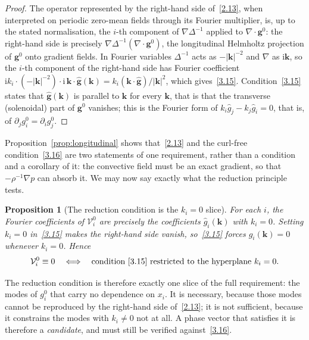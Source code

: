\documentclass[11pt]{jfm}
\newtheorem{proposition}[lemma]{Proposition}
\numberwithin{equation}{section}
\begin{document}
\begin{proof}
The operator represented by the right-hand side of~\eqref{2.13}, when interpreted on periodic
zero-mean fields through its Fourier multiplier, is, up to the stated normalisation, the $i$-th
component of $\nabla\Delta^{-1}$ applied to $\nabla\cdot\boldsymbol{g}^0$: the right-hand side
is precisely $\nabla\Delta^{-1}(\nabla\cdot\boldsymbol{g}^0)$, the longitudinal Helmholtz projection of
$\boldsymbol{g}^0$ onto gradient fields. In Fourier variables $\Delta^{-1}$ acts as
$-|\boldsymbol{k}|^{-2}$ and $\nabla$ as $\mathrm{i}\boldsymbol{k}$, so the $i$-th component of
the right-hand side has Fourier coefficient
$\mathrm{i}k_i\cdot(-|\boldsymbol{k}|^{-2})\cdot\mathrm{i}\,\boldsymbol{k}\cdot
\widehat{\boldsymbol{g}}(\boldsymbol{k})
= k_i(\boldsymbol{k}\cdot\widehat{\boldsymbol{g}})/|\boldsymbol{k}|^{2}$,
which gives~\eqref{3.15}. Condition~\eqref{3.15} states that
$\widehat{\boldsymbol{g}}(\boldsymbol{k})$ is parallel to $\boldsymbol{k}$ for every
$\boldsymbol{k}$, that is that the transverse (solenoidal) part of $\boldsymbol{g}^0$ vanishes;
this is the Fourier form of $k_i\widehat{g}_j-k_j\widehat{g}_i=0$, that is, of
$\partial_j g_i^0 = \partial_i g_j^0$.
\end{proof}

Proposition~\ref{prop:longitudinal} shows that~\eqref{2.13} and the curl-free
condition~\eqref{3.16} are two statements of one requirement, rather than a condition and a
corollary of it: the convective field must be an exact gradient, so that $-\rho^{-1}\nabla p$
can absorb it. We may now say exactly what the reduction principle tests.

\begin{proposition}[The reduction condition is the $k_i=0$ slice]
\label{prop:slice}
For each $i$, the Fourier coefficients of $\mathcal V_i^0$ are precisely the coefficients
$\widehat{g}_i(\boldsymbol{k})$ with $k_i=0$. Setting $k_i=0$ in~\eqref{3.15} makes the
right-hand side vanish, so~\eqref{3.15} forces $\widehat{g}_i(\boldsymbol{k})=0$ whenever
$k_i=0$. Hence
\[
\mathcal V_i^0 \equiv 0
\quad\Longleftrightarrow\quad
\text{condition~\eqref{3.15} restricted to the hyperplane } k_i = 0 .
\]
\end{proposition}

The reduction condition is therefore exactly one slice of the full requirement: the modes of
$g_i^0$ that carry no dependence on $x_i$. It is necessary, because those modes cannot be
reproduced by the right-hand side of~\eqref{2.13}; it is not sufficient, because it constrains the
modes with $k_i\neq0$ not at all. A phase vector that satisfies it is therefore a
\emph{candidate}, and must still be verified against~\eqref{3.16}.
\end{document}
